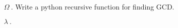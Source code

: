 \documentclass{article}
\begin{document}
\pagecolor{BLUE20}
\ttfamily
\sloppy
\vspace*{\fill}
\begin{itemize}
	\item[\textcolor{GREEN10}{$\Omega ~.$}]\textcolor{GREEN10}{Write a python recursive function for finding GCD.}

	\item[\textcolor{WHITE01}{$\lambda ~.$}]
\inputminted[tabsize=4, breaklines, mathescape]{python}{main.py}
\end{itemize}
\vspace*{\fill}
\end{document}
